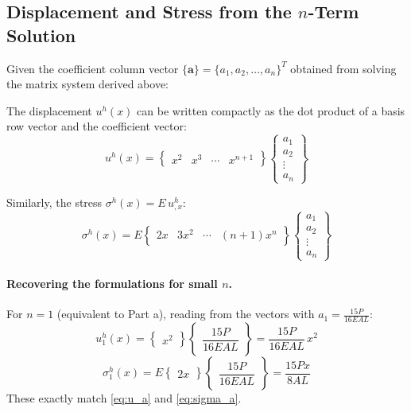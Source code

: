 \documentclass[11pt, a4paper]{article}
\begin{document}
\subsection{Displacement and Stress from the \texorpdfstring{$n$}{n}-Term Solution}

Given the coefficient column vector $\{\mathbf{a}\}=\{a_1,a_2,\dots,a_n\}^T$
obtained from solving the matrix system derived above:

The displacement $u^h(x)$ can be written compactly as the dot product of a basis row vector and the coefficient vector:
\begin{equation}\label{eq:uh_eval}
u^h(x) =
\begin{Bmatrix}
x^2 & x^3 & \cdots & x^{n+1}
\end{Bmatrix}
\begin{Bmatrix} a_1 \\ a_2 \\ \vdots \\ a_n \end{Bmatrix}
\end{equation}

Similarly, the stress $\sigma^h(x) = E\,u^h_{,x}$:
\begin{equation}\label{eq:sh_eval}
\sigma^h(x) = E
\begin{Bmatrix}
2x & 3x^2 & \cdots & (n{+}1)x^n
\end{Bmatrix}
\begin{Bmatrix} a_1 \\ a_2 \\ \vdots \\ a_n \end{Bmatrix}
\end{equation}

\paragraph{Recovering the formulations for small $n$.}
For $n=1$ (equivalent to Part a), reading from the vectors with $a_1=\frac{15P}{16EAL}$:
\[
u^h_1(x) = \begin{Bmatrix} x^2 \end{Bmatrix} \begin{Bmatrix} \dfrac{15P}{16EAL} \end{Bmatrix} = \frac{15P}{16EAL}\,x^2
\]
\[
\sigma^h_1(x) = E \begin{Bmatrix} 2x \end{Bmatrix} \begin{Bmatrix} \dfrac{15P}{16EAL} \end{Bmatrix} = \frac{15P x}{8AL}
\]
These exactly match \cref{eq:u_a} and \cref{eq:sigma_a}.
\end{document}
